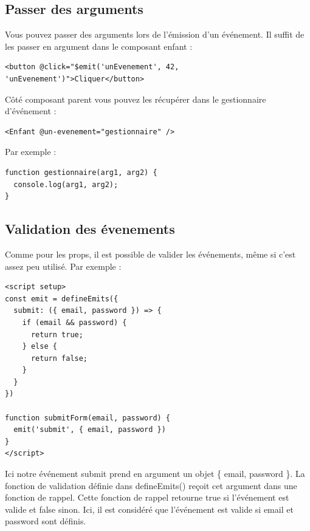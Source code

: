 \documentclass{article}
\begin{document}
\subsection{Passer des arguments}
Vous pouvez passer des arguments lors de l'émission d'un événement. Il suffit de les passer en argument dans le composant enfant :
\begin{verbatim}
<button @click="$emit('unEvenement', 42, 'unEvenement')">Cliquer</button>
\end{verbatim}
Côté composant parent vous pouvez les récupérer dans le gestionnaire d'événement :
\begin{verbatim}
<Enfant @un-evenement="gestionnaire" />
\end{verbatim}
Par exemple :
\begin{verbatim}
function gestionnaire(arg1, arg2) {
  console.log(arg1, arg2);
}
\end{verbatim}

\subsection{Validation des évenements}
Comme pour les {\color{monOrange}props}, il est possible de valider les événements, même si c'est assez peu utilisé. Par exemple :
\begin{verbatim}
<script setup>
const emit = defineEmits({
  submit: ({ email, password }) => {
    if (email && password) {
      return true;
    } else {
      return false;
    }
  }
})

function submitForm(email, password) {
  emit('submit', { email, password })
}
</script>
\end{verbatim}
Ici notre événement {\color{monOrange}submit} prend en argument un objet  {\color{monOrange}\{ email, password \}}. La fonction de validation définie dans {\color{monOrange}defineEmits()} reçoit cet argument dans une fonction de rappel. Cette fonction de rappel retourne {\color{monOrange}true} si l'événement est valide et false sinon. Ici, il est considéré que l'événement est valide si {\color{monOrange}email} et {\color{monOrange}password} sont définis.
\end{document}

